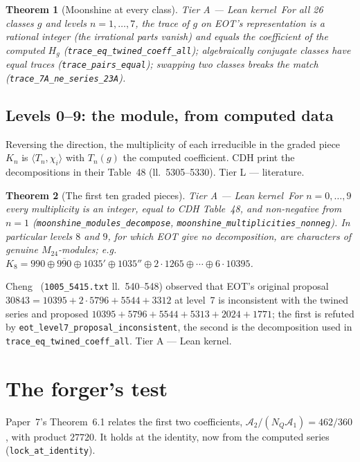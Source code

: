 \documentclass[11pt,a4paper]{article}
\newtheorem{theorem}{Theorem}[section]
\theoremstyle{remark}
\newcommand{\tierA}{\colorbox{green!15}{\textsf{\scriptsize Tier A --- Lean kernel}}}
\newcommand{\tierL}{\colorbox{blue!10}{\textsf{\scriptsize Tier L --- literature}}}
\newcommand{\lean}[1]{\texttt{#1}}
\newcommand{\Mtf}{M_{24}}
\begin{document}
\begin{theorem}[Moonshine at every class] \tierA\
For all 26 classes $g$ and levels $n=1,\dots,7$, the trace of $g$ on EOT's representation is a rational
integer (the irrational parts vanish) and equals the coefficient of the computed $H_g$
(\lean{trace\_eq\_twined\_coeff\_all}); algebraically conjugate classes have equal traces
(\lean{trace\_pairs\_equal}); swapping two classes breaks the match (\lean{trace\_7A\_ne\_series\_23A}).
\end{theorem}

\subsection{Levels 0--9: the module, from computed data}
Reversing the direction, the multiplicity of each irreducible in the graded piece $K_n$ is
$\langle T_n,\chi_i\rangle$ with $T_n(g)$ the computed coefficient. CDH print the decompositions in their
Table~48 (ll.~5305--5330). \tierL.

\begin{theorem}[The first ten graded pieces] \tierA\
For $n=0,\dots,9$ every multiplicity is an integer, equal to CDH Table~48, and non-negative from $n=1$
(\lean{moonshine\_modules\_decompose}, \lean{moonshine\_multiplicities\_nonneg}). In particular levels
$8$ and $9$, for which EOT give no decomposition, are characters of genuine $\Mtf$-modules; e.g.
$K_8=990\oplus\overline{990}\oplus1035'\oplus1035''\oplus2\cdot1265\oplus\cdots\oplus6\cdot10395$.
\end{theorem}
Cheng~\cite{Cheng2010} (\texttt{1005\_5415.txt} ll.~540--548) observed that EOT's original proposal
$30843=10395+2\cdot5796+5544+3312$ at level~7 is inconsistent with the twined series and proposed
$10395+5796+5544+5313+2024+1771$; the first is refuted by \lean{eot\_level7\_proposal\_inconsistent},
the second is the decomposition used in \lean{trace\_eq\_twined\_coeff\_all}. \tierA.

\section{The forger's test}
\label{sec:forger}
Paper~7's Theorem~6.1 relates the first two coefficients, $\mathcal{A}_2/(N_Q\mathcal{A}_1)=462/360$,
with product $27720$. It holds at the identity, now from the computed series (\lean{lock\_at\_identity}).
\end{document}
